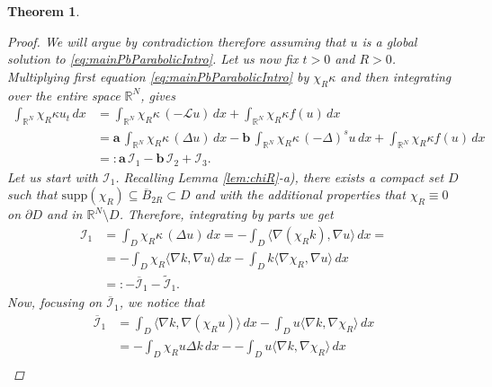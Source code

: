 \documentclass[11pt,a4paper,reqno]{amsart}
\def \R {\mathbb{R}}
\theoremstyle{definition}
\theoremstyle{plain}
\newtheorem{theorem}[definition]{Theorem}
\numberwithin{equation}{section}
\begin{document}
\begin{theorem}
\begin{proof}
We will argue by contradiction therefore assuming that
$u$ is a global solution to \eqref{eq:mainPbParabolicIntro}.
Let us now fix $t>0$ and $R>0$. Multiplying first equation \eqref{eq:mainPbParabolicIntro} by $\chi_{R}\kappa$ and then integrating over the entire space $\mathbb{R}^N$, gives
\begin{equation}\label{eq:testando_con_chiRk}
	\begin{aligned}
	\int_{\mathbb{R}^{N}}\chi_{R}\kappa u_{t}\, dx &= \int_{\mathbb{R}^{N}}\chi_{R}\kappa \, (-\mathcal{L}u)\, dx + \int_{\mathbb{R}^{N}}\chi_{R}\kappa f(u)\, dx\\
	&= \mathbf{a}\, \int_{\mathbb{R}^{N}}\chi_{R}\kappa \, (\Delta u)\, dx - \mathbf{b}\, \int_{\mathbb{R}^{N}}\chi_{R}\kappa \,(-\Delta)^{s} u\, dx + \int_{\mathbb{R}^{N}}\chi_{R}\kappa f(u)\, dx\\
	&=: \mathbf{a} \, \mathcal{I}_1 - \mathbf{b} \, \mathcal{I}_2 + \mathcal{I}_3.
\end{aligned}
\end{equation} 	
Let us start with $\mathcal{I}_1$. Recalling Lemma \ref{lem:chiR}-a), there exists a compact set $D$ such that $\mathrm{supp}(\chi_{R})\subseteq \overline{B}_{2R}\subset D$ and with the additional properties that $\chi_{R}\equiv 0$ on $\partial D$ and in $\mathbb{R}^{N}\setminus D$. Therefore, integrating by parts we get
\begin{equation}\label{eq:I1}
	\begin{aligned}
		\mathcal{I}_1 &= \int_{D}\chi_{R}\kappa \, (\Delta u)\, dx = -\int_{D}\langle \nabla(\chi_R k), \nabla u\rangle \, dx =  \\
		&= -\int_{D}\chi_R \langle \nabla k, \nabla u\rangle \, dx -\int_{D}k\langle \nabla \chi_R, \nabla u\rangle \, dx\\
		&=: -\overline{\mathcal{I}}_1 - \widetilde{\mathcal{I}}_1.
	\end{aligned}
\end{equation}
Now, focusing on $\overline{\mathcal{I}}_1$, we notice that
\begin{equation}\label{eq:overI1}
	\begin{aligned}
		\overline{\mathcal{I}}_1 &= \int_{D} \langle \nabla k, \nabla (\chi_{R}u)\rangle \, dx - \int_{D}u\langle \nabla k, \nabla \chi_{R}\rangle \, dx \\
		& = -\int_{D}\chi_{R}u \Delta k \, dx - - \int_{D}u\langle \nabla k, \nabla \chi_{R}\rangle \, dx \\

\end{aligned}
\end{equation}
\end{proof}
\end{theorem}
\end{document}
